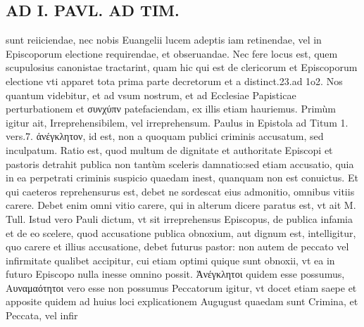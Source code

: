 \documentclass{article}
\begin{document}
\begin{pages}
\section*{AD I. PAVL. AD TIM. }
\marginpar{[ p.102 ]}\pstart sunt reiiciendae, nec nobis Euangelii lucem adeptis iam retinendae, vel in Episcoporum electione requirendae, et obseruandae. Nec fere locus est, quem scupulosius canonistae tractarint, quam hic qui est de clericorum et Episcoporum electione vti apparet tota prima parte decretorum et a distinct.23.ad 1o2. Nos quantum videbitur, et ad vsum nostrum, et ad Ecclesiae Papisticae perturbationem et συνχύπν patefaciendam, ex illis etiam hauriemus. Primùm igitur ait, Irreprehensibilem, vel irreprehensum. Paulus in Epistola ad Titum 1. vers.7. ἀνέγκλητον, id est, non a quoquam publici criminis accusatum, sed inculpatum. Ratio est, quod multum de dignitate et authoritate Episcopi et pastoris detrahit publica non tantùm sceleris damnatio:sed etiam accusatio, quia in ea perpetrati criminis suspicio quaedam inest, quanquam non est conuictus. Et qui caeteros reprehensurus est, debet ne sordescat eius admonitio, omnibus vitiis carere. Debet enim omni vitio carere, qui in alterum dicere paratus est, vt ait M. Tull. Istud vero Pauli dictum, vt sit irreprehensus Episcopus, de publica infamia et de eo scelere, quod accusatione publica obnoxium, aut dignum est, intelligitur, quo carere et illius accusatione, debet futurus pastor: non autem de peccato vel infirmitate qualibet accipitur, cui etiam optimi quique sunt obnoxii, vt ea in futuro Episcopo nulla inesse omnino possit. Ἀνέγκλητοι quidem esse possumus, Αυναμαότητοι vero esse non possumus Peccatorum igitur, vt docet etiam saepe et apposite quidem ad huius loci explicationem Augugust quaedam sunt Crimina, et Peccata, vel infir\pend

\end{pages}
\end{document}

